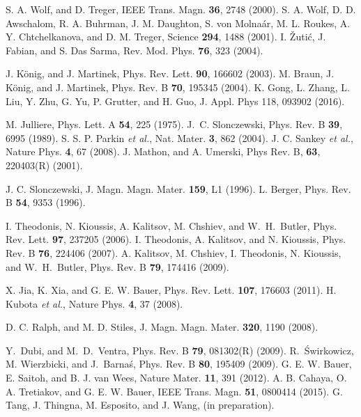 \documentclass[aps,prb,twocolumn,footinbib,showpacs,superscriptaddress,preprintnumbers,amsmath,amssymb]{revtex4-1}
\begin{document}
\begin{thebibliography}{99}
 S. A. Wolf, and D. Treger, IEEE Trans. Magn. {\bf 36}, 2748 (2000).
 S. A. Wolf, D. D. Awschalom, R. A. Buhrman, J. M. Daughton, S. von Molna\'{a}r, M. L. Roukes, A. Y. Chtchelkanova, and D. M. Treger, Science {\bf 294}, 1488 (2001).
 I. \v{Z}uti\'{c}, J. Fabian, and S. Das Sarma, Rev. Mod. Phys. {\bf 76}, 323 (2004).

 J. K\"{o}nig, and J. Martinek, Phys. Rev. Lett. {\bf 90}, 166602 (2003).
 M. Braun, J. K\"{o}nig, and J. Martinek, Phys. Rev. B {\bf 70}, 195345 (2004).
 K. Gong, L. Zhang, L. Liu, Y. Zhu, G. Yu, P. Grutter, and H. Guo, J. Appl. Phys 118, 093902 (2016).

 M. Julliere, Phys. Lett. A {\bf 54}, 225 (1975).
 J.~C. Slonczewski, Phys. Rev. B {\bf 39}, 6995 (1989).
 S. S. P. Parkin {\it et al.}, Nat. Mater. {\bf 3}, 862 (2004).
 J. C. Sankey {\it et al.}, Nature Phys. {\bf 4}, 67 (2008).
 J. Mathon, and A. Umerski, Phys Rev. B, {\bf 63}, 220403(R) (2001).

 J. C. Slonczewski, J. Magn. Magn. Mater. {\bf 159}, L1 (1996).
 L. Berger, Phys. Rev. B {\bf 54}, 9353 (1996).

 I. Theodonis, N. Kioussis, A. Kalitsov, M. Chshiev, and W.~H.~Butler, Phys. Rev. Lett. {\bf 97}, 237205 (2006).
 I. Theodonis, A. Kalitsov, and N. Kioussis, Phys. Rev. B {\bf 76}, 224406 (2007).
 A. Kalitsov, M. Chshiev, I. Theodonis, N. Kioussis, and W.~H.~Butler, Phys. Rev. B {\bf 79}, 174416 (2009).

 X. Jia, K. Xia, and G. E. W. Bauer, Phys. Rev. Lett. {\bf 107}, 176603 (2011).
 H. Kubota {\it et al.}, Nature Phys. {\bf 4}, 37 (2008).

 D. C. Ralph, and M. D. Stiles, J. Magn. Magn. Mater. {\bf 320}, 1190 (2008).

 Y.~Dubi, and M.~D.~Ventra, Phys. Rev. B {\bf 79}, 081302(R) (2009).
 R.~\'{S}wirkowicz, M. Wierzbicki, and J.~Barna\'{s}, Phys. Rev. B {\bf 80}, 195409 (2009).
 G. E. W. Bauer, E. Saitoh, and B. J. van Wees, Nature Mater. {\bf 11}, 391 (2012).
 A. B. Cahaya, O. A. Tretiakov, and G. E. W. Bauer, IEEE Trans. Magn. {\bf 51}, 0800414 (2015).
 G. Tang, J. Thingna, M. Esposito, and J. Wang, (in preparation). 


\end{thebibliography}
\end{document}
